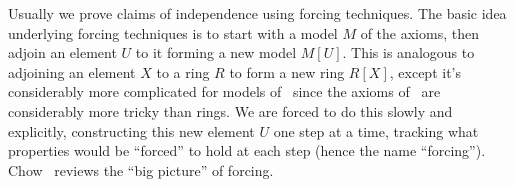 \begin{node}[Axioms]
\begin{node}[Remarks]
\begin{node}
Usually we prove claims of independence using forcing techniques. The
basic idea underlying forcing techniques is to start with a model $M$ of
the axioms, then adjoin an element $U$ to it forming a new model $M[U]$.
This is analogous to adjoining an element $X$ to a ring $R$ to form a
new ring $R[X]$, except it's considerably more complicated for models of
\ZF\ since the axioms of \ZF\ are considerably more tricky than
rings. We are forced to do this slowly and explicitly, constructing this
new element $U$ one step at a time, tracking what properties would be
``forced'' to hold at each step (hence the name
``forcing''). Chow~\cite{chow2008beginners} reviews the ``big picture''
of forcing.
\end{node}
\end{node} %
\end{node} %

